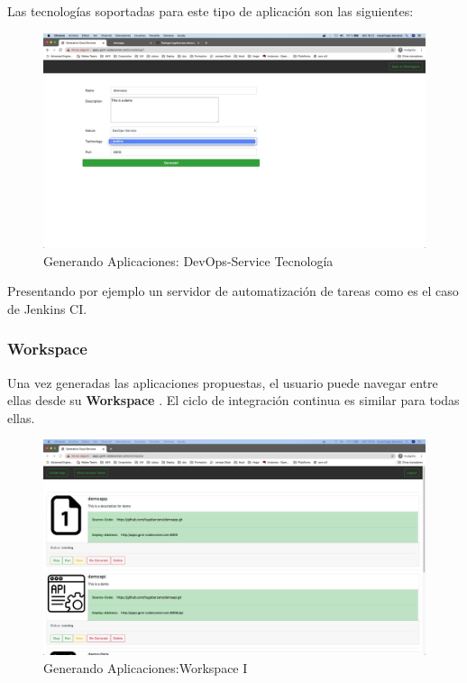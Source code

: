 \documentclass[a4paper,11pt]{book}
\begin{document}
Las tecnologías soportadas para este tipo de aplicación son las siguientes: 

\begin{figure}[H]
\centering
\includegraphics[scale=0.2]{imagenes/casouso/21.png}
\caption{ Generando Aplicaciones: DevOps-Service Tecnología   }
\end{figure}

Presentando por ejemplo un servidor de automatización de tareas como es el caso de Jenkins CI. 

\subsubsection{Workspace}

Una vez generadas las aplicaciones propuestas, el usuario puede navegar entre ellas desde su \textbf{Workspace} . El ciclo de integración continua es similar para todas ellas. 
\begin{figure}[H]
\centering
\includegraphics[scale=0.2]{imagenes/casouso/1_1.png}
\caption{  Generando Aplicaciones:Workspace I  }
\end{figure}
\end{document}

